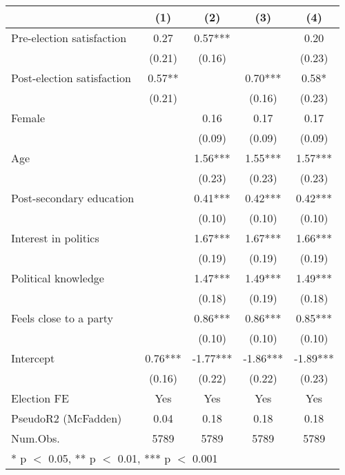 \begin{table}
\centering
\begin{tabular}[t]{lcccc}
\toprule
  & (1) & (2) & (3) & (4)\\
\midrule
Pre-election satisfaction & 0.27 & 0.57*** &  & 0.20\\
 & (0.21) & (0.16) &  & (0.23)\\
Post-election satisfaction & 0.57** &  & 0.70*** & 0.58*\\
 & (0.21) &  & (0.16) & (0.23)\\
Female &  & 0.16 & 0.17 & 0.17\\
 &  & (0.09) & (0.09) & (0.09)\\
Age &  & 1.56*** & 1.55*** & 1.57***\\
 &  & (0.23) & (0.23) & (0.23)\\
Post-secondary education &  & 0.41*** & 0.42*** & 0.42***\\
 &  & (0.10) & (0.10) & \vphantom{1} (0.10)\\
Interest in politics &  & 1.67*** & 1.67*** & 1.66***\\
 &  & (0.19) & (0.19) & (0.19)\\
Political knowledge &  & 1.47*** & 1.49*** & 1.49***\\
 &  & (0.18) & (0.19) & (0.18)\\
Feels close to a party &  & 0.86*** & 0.86*** & 0.85***\\
 &  & (0.10) & (0.10) & (0.10)\\
Intercept & 0.76*** & -1.77*** & -1.86*** & -1.89***\\
 & (0.16) & (0.22) & (0.22) & (0.23)\\
\midrule
Election FE & Yes & Yes & Yes & Yes\\
PseudoR2 (McFadden) & 0.04 & 0.18 & 0.18 & 0.18\\
Num.Obs. & 5789 & 5789 & 5789 & 5789\\
\bottomrule
\multicolumn{5}{l}{\rule{0pt}{1em}* p $<$ 0.05, ** p $<$ 0.01, *** p $<$ 0.001}\\
\end{tabular}
\end{table}

